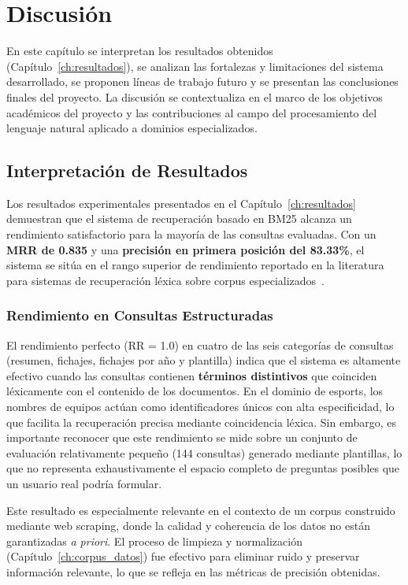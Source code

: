 ﻿\chapter{Discusión}
\label{ch:discusion}

En este capítulo se interpretan los resultados obtenidos (Capítulo~\ref{ch:resultados}), se analizan las fortalezas y limitaciones del sistema desarrollado, se proponen líneas de trabajo futuro y se presentan las conclusiones finales del proyecto. La discusión se contextualiza en el marco de los objetivos académicos del proyecto y las contribuciones al campo del procesamiento del lenguaje natural aplicado a dominios especializados.

\section{Interpretación de Resultados}

Los resultados experimentales presentados en el Capítulo~\ref{ch:resultados} demuestran que el sistema de recuperación basado en BM25 alcanza un rendimiento satisfactorio para la mayoría de las consultas evaluadas. Con un \textbf{MRR de 0.835} y una \textbf{precisión en primera posición del 83.33\%}, el sistema se sitúa en el rango superior de rendimiento reportado en la literatura para sistemas de recuperación léxica sobre corpus especializados~\cite{robertson2009probabilistic}.

\subsection{Rendimiento en Consultas Estructuradas}

El rendimiento perfecto (RR = 1.0) en cuatro de las seis categorías de consultas (resumen, fichajes, fichajes por año y plantilla) indica que el sistema es altamente efectivo cuando las consultas contienen \textbf{términos distintivos} que coinciden léxicamente con el contenido de los documentos. En el dominio de esports, los nombres de equipos actúan como identificadores únicos con alta especificidad, lo que facilita la recuperación precisa mediante coincidencia léxica. Sin embargo, es importante reconocer que este rendimiento se mide sobre un conjunto de evaluación relativamente pequeño (144 consultas) generado mediante plantillas, lo que no representa exhaustivamente el espacio completo de preguntas posibles que un usuario real podría formular.

Este resultado es especialmente relevante en el contexto de un corpus construido mediante web scraping, donde la calidad y coherencia de los datos no están garantizadas \textit{a priori}. El proceso de limpieza y normalización (Capítulo~\ref{ch:corpus_datos}) fue efectivo para eliminar ruido y preservar información relevante, lo que se refleja en las métricas de precisión obtenidas.

